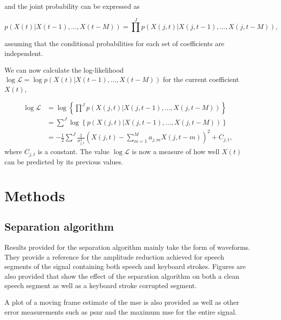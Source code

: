 and the joint probability can be expressed as

\begin{equation}\label{eq:marginal}
p\left(X(t)|X\left(t-1\right),\ldots,X\left(t-M\right)\right) = \prod^J p\left(X\left(j,t\right)|X\left(j,t-1\right),\ldots,X\left(j,t-M\right)\right),
\end{equation}

assuming that the conditional probabilities for each set of coefficients are independent.

We can now calculate the log-likelihood $\log\mathcal{L} = \log{p\left(X(t)|X\left(t-1\right),\ldots,X\left(t-M\right)\right)}$ for the current coefficient $X(t)$,

\begin{align}\label{eq:loglike}
\log \mathcal{L} &= \log \left\{ \prod^J p \left( X(j,t) | X(j,t-1),\ldots,X(j,t-M) \right) \right\} \\
&=  \sum^J \log \left\{p \left( X(j,t) | X(j,t-1),\ldots,X(j,t-M) \right) \right\}\nonumber\\
&=  -\frac{1}{2} \sum^J \frac{1}{\sigma_{j,t}^2}\left(X(j,t) -  \sum_{m=1}^{M} a_{j,m} X(j,t - m) \right)^2 + C_{j,t}\nonumber,
\end{align}
where $C_{j,t}$ is a constant. The value $\log \mathcal{L}$ is now a measure of how well $X(t)$ can be predicted by its previous values.

\section{Methods}\label{sec:WPmethods} %
\subsection{Separation algorithm}
Results provided for the separation algorithm mainly take the form of waveforms. They provide a reference for the amplitude reduction achieved for speech segments of the signal containing both speech and keyboard strokes. Figures are also provided that show the effect of the separation algorithm on both a clean speech segment as well as a keyboard stroke corrupted segment.

A plot of a moving frame estimate of the \gls{mse} is also provided as well as other error measurements such as \gls{psnr} and the maximum \gls{mse} for the entire signal.

